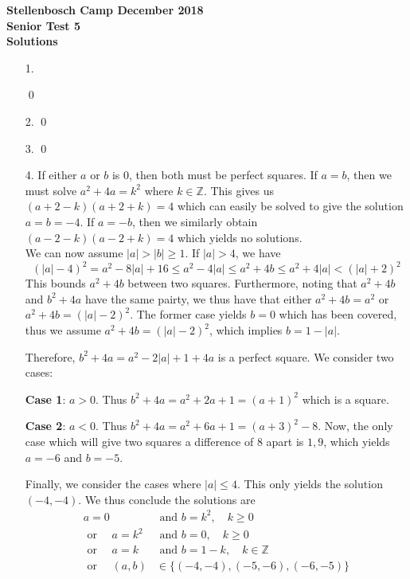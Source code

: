 \documentclass[a4paper, 12pt]{article}
\begin{document}
\begin{center}
\textbf{Stellenbosch Camp December 2018 \\ Senior Test 5} \\
\textbf{Solutions}
\end{center}
\vspace{5mm}

\begin{enumerate}
    
\item[1.] 


\qed
\vspace{5mm}


\item[2.]
\qed


\item[3.]
 \qed
\vspace{5mm}

\item[4.]  If either $a$ or $b$ is 0, then both must be perfect squares. If $a = b$, then we must solve $a^2 + 4a = k^2$ where $k \in \mathbb{Z}$. This gives us $(a+2-k)(a+2+k) = 4$ which can easily be solved to give the solution $a = b = -4$. If $a = -b$, then we similarly obtain $(a-2-k)(a-2+k) = 4$ which yields no solutions. \\

We can now assume $|a| > |b| \geq 1$.  If $|a| > 4$, we have
\begin{equation*}
    (|a| - 4)^2 = a^2 - 8|a| + 16 \leq a^2 - 4|a| \leq a^2 + 4b \leq a^2 + 4|a| < (|a| + 2)^2
\end{equation*}
This bounds $a^2 + 4b$ between two squares. Furthermore, noting that $a^2 + 4b$ and $b^2 + 4a$ have the same pairty, we thus have that either $a^2 + 4b = a^2$ or $a^2 + 4b = (|a| - 2)^2$. The former case yields $b = 0$ which has been covered, thus we assume $a^2 + 4b = (|a| - 2)^2$, which implies $b = 1 - |a|$.

Therefore, $b^2 + 4a = a^2 - 2|a| + 1 + 4a$ is a perfect square. We consider two cases:

\textbf{Case 1}: $a > 0$. Thus $b^2 + 4a = a^2 + 2a + 1 = (a+1)^2$ which is a square.

\textbf{Case 2}: $a < 0$. Thus $b^2 + 4a = a^2 + 6a + 1 = (a + 3)^2 - 8$. Now, the only case which will give two squares a difference of 8 apart is $1, 9$, which yields $a = -6$ and $b = -5$.

Finally, we consider the cases where $|a| \leq 4$. This only yields the solution $(-4, -4)$. We thus conclude the solutions are
\begin{align*}
    a = 0 &\textrm{ and } b = k^2, \quad k \geq 0 \\
    \textrm{ or } \quad a = k^2 &\textrm{ and } b = 0, \quad k \geq 0 \\
    \textrm{ or } \quad a = k &\textrm{ and } b = 1-k, \quad k \in \mathbb{Z} \\
    \textrm{ or } \quad (a, b) &\in \{(-4, -4), (-5, -6), (-6, -5) \}
\end{align*}


\end{enumerate}
\end{document}
